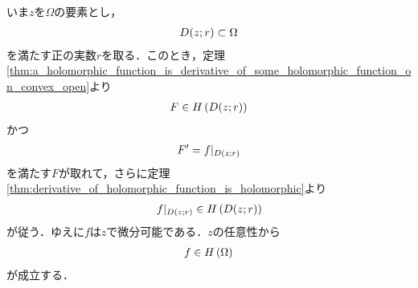 	\begin{sketch}
		いま$z$を$\Omega$の要素とし，
		\begin{align}
			D(z;r) \subset \Omega
		\end{align}
		を満たす正の実数$r$を取る．このとき，定理\ref{thm:a_holomorphic_function_is_derivative_of_some_holomorphic_function_on_convex_open}より
		\begin{align}
			F \in H\left(D(z;r)\right)
		\end{align}
		かつ
		\begin{align}
			F' = f|_{D(z;r)}
		\end{align}
		を満たす$F$が取れて，さらに定理\ref{thm:derivative_of_holomorphic_function_is_holomorphic}より
		\begin{align}
			f|_{D(z;r)} \in H\left(D(z;r)\right)
		\end{align}
		が従う．ゆえに$f$は$z$で微分可能である．$z$の任意性から
		\begin{align}
			f \in H\left(\Omega\right)
		\end{align}
		が成立する．
		\QED
	\end{sketch}
	
